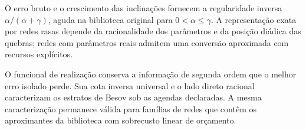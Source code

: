 \documentclass[11pt,a4paper]{article}
\theoremstyle{definition}
\theoremstyle{remark}
\begin{document}
O erro bruto e o crescimento das inclinações fornecem a regularidade inversa $\alpha/(\alpha+\gamma)$, aguda na biblioteca original para $0<\alpha\le\gamma$. A representação exata por redes rasas depende da racionalidade dos parâmetros e da posição diádica das quebras; redes com parâmetros reais admitem uma conversão aproximada com recursos explícitos.

O funcional de realização conserva a informação de segunda ordem que o melhor erro isolado perde. Sua cota inversa universal e o lado direto racional caracterizam os estratos de Besov sob as agendas declaradas. A mesma caracterização permanece válida para famílias de redes que contêm os aproximantes da biblioteca com sobrecusto linear de orçamento.

\FloatBarrier
\clearpage
\renewcommand{\refname}{Referências}

\begingroup\small
\setlength{\bibsep}{3pt}

\endgroup
\end{document}
